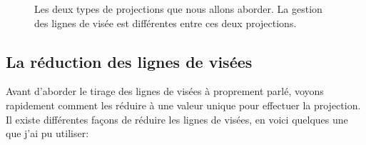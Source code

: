 \begin{figure}[bth]
    \center
    \qquad
    \caption[Deux types de projections]{Les deux types de projections que nous allons aborder.
    La gestion des lignes de visée est différentes entre ces deux projections.}
 	\label{fig:raycast_projection}
\end{figure}

\subsection{La réduction des lignes de visées}

Avant d'aborder le tirage des lignes de visées à proprement parlé, voyons rapidement comment les réduire à une valeur unique pour effectuer la projection.
Il existe différentes façons de réduire les lignes de visées, en voici quelques une que j'ai pu utiliser:


